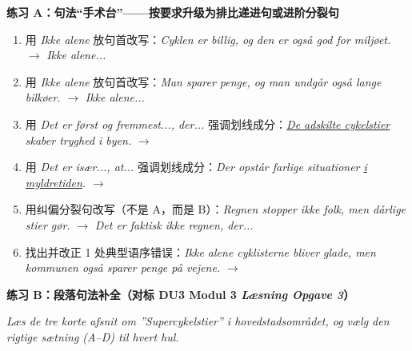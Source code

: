\textbf{练习 A：句法“手术台”——按要求升级为排比递进句或进阶分裂句}
\begin{enumerate}
  \item 用 \textit{Ikke alene} 放句首改写：\textit{Cyklen er billig, og den er også god for miljøet.} $\rightarrow$ \textit{Ikke alene...}
  \item 用 \textit{Ikke alene} 放句首改写：\textit{Man sparer penge, og man undgår også lange bilkøer.} $\rightarrow$ \textit{Ikke alene...}
  \item 用 \textit{Det er først og fremmest..., der...} 强调划线成分：\textit{\underline{De adskilte cykelstier} skaber tryghed i byen.} $\rightarrow$
  \item 用 \textit{Det er især..., at...} 强调划线成分：\textit{Der opstår farlige situationer \underline{i myldretiden}.} $\rightarrow$
  \item 用纠偏分裂句改写（不是 A，而是 B）：\textit{Regnen stopper ikke folk, men dårlige stier gør.} $\rightarrow$ \textit{Det er faktisk ikke regnen, der...}
  \item 找出并改正 1 处典型语序错误：\textit{Ikke alene cyklisterne bliver glade, men kommunen også sparer penge på vejene.} $\rightarrow$
\end{enumerate}

\textbf{练习 B：段落句法补全（对标 DU3 Modul 3 \textit{Læsning Opgave 3}）}

\textit{Læs de tre korte afsnit om ”Supercykelstier” i hovedstadsområdet, og vælg den rigtige sætning (A--D) til hvert hul.}


